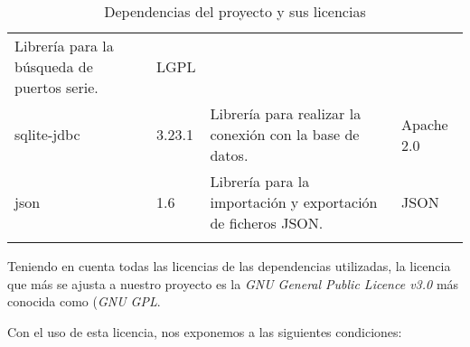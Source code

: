 \begin{longtable}[]{@{}llll@{}}
\begin{minipage}[t]{0.49\columnwidth}
Librería para la búsqueda de puertos serie.\strut
\end{minipage} & \begin{minipage}[t]{0.11\columnwidth}\raggedright\strut
LGPL\strut
\end{minipage}\tabularnewline
\begin{minipage}[t]{0.18\columnwidth}\raggedright\strut
sqlite-jdbc\strut
\end{minipage} & \begin{minipage}[t]{0.08\columnwidth}\raggedright\strut
3.23.1\strut
\end{minipage} & \begin{minipage}[t]{0.49\columnwidth}\raggedright\strut
Librería para realizar la conexión con la base de datos.\strut
\end{minipage} & \begin{minipage}[t]{0.11\columnwidth}\raggedright\strut
Apache 2.0\strut
\end{minipage}\tabularnewline
\begin{minipage}[t]{0.18\columnwidth}\raggedright\strut
json\strut
\end{minipage} & \begin{minipage}[t]{0.08\columnwidth}\raggedright\strut
1.6\strut
\end{minipage} & \begin{minipage}[t]{0.49\columnwidth}\raggedright\strut
Librería para la importación y exportación de ficheros JSON.\strut
\end{minipage} & \begin{minipage}[t]{0.11\columnwidth}\raggedright\strut
JSON\strut
\end{minipage}\tabularnewline
\bottomrule
\caption{Dependencias del proyecto y sus licencias}
\end{longtable}


Teniendo en cuenta todas las licencias de las dependencias utilizadas, la licencia que más se ajusta a nuestro proyecto es la \emph{GNU General Public Licence v3.0} más conocida como (\emph{{GNU GPL}}.

Con el uso de esta licencia, nos exponemos a las siguientes condiciones:


